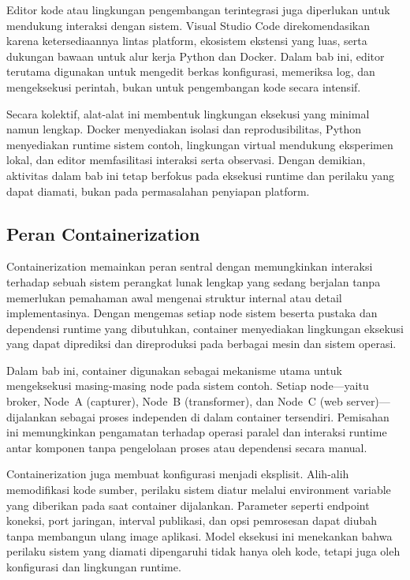 Editor kode atau lingkungan pengembangan terintegrasi juga diperlukan untuk
mendukung interaksi dengan sistem. Visual Studio Code direkomendasikan karena
ketersediaannya lintas platform, ekosistem ekstensi yang luas, serta dukungan
bawaan untuk alur kerja Python dan Docker. Dalam bab ini, editor terutama
digunakan untuk mengedit berkas konfigurasi, memeriksa log, dan mengeksekusi
perintah, bukan untuk pengembangan kode secara intensif.

Secara kolektif, alat-alat ini membentuk lingkungan eksekusi yang minimal namun
lengkap. Docker menyediakan isolasi dan reprodusibilitas, Python menyediakan
runtime sistem contoh, lingkungan virtual mendukung eksperimen lokal, dan editor
memfasilitasi interaksi serta observasi. Dengan demikian, aktivitas dalam bab ini
tetap berfokus pada eksekusi runtime dan perilaku yang dapat diamati, bukan pada
permasalahan penyiapan platform.

\subsection{Peran Containerization}

Containerization memainkan peran sentral dengan memungkinkan interaksi terhadap
sebuah sistem perangkat lunak lengkap yang sedang berjalan tanpa memerlukan
pemahaman awal mengenai struktur internal atau detail implementasinya. Dengan
mengemas setiap node sistem beserta pustaka dan dependensi runtime yang
dibutuhkan, container menyediakan lingkungan eksekusi yang dapat diprediksi dan
direproduksi pada berbagai mesin dan sistem operasi.

Dalam bab ini, container digunakan sebagai mekanisme utama untuk mengeksekusi
masing-masing node pada sistem contoh. Setiap node—yaitu broker, Node~A
(capturer), Node~B (transformer), dan Node~C (web server)—dijalankan sebagai proses
independen di dalam container tersendiri. Pemisahan ini memungkinkan pengamatan
terhadap operasi paralel dan interaksi runtime antar komponen tanpa pengelolaan
proses atau dependensi secara manual.

Containerization juga membuat konfigurasi menjadi eksplisit. Alih-alih
memodifikasi kode sumber, perilaku sistem diatur melalui environment variable
yang diberikan pada saat container dijalankan. Parameter seperti endpoint
koneksi, port jaringan, interval publikasi, dan opsi pemrosesan dapat diubah
tanpa membangun ulang image aplikasi. Model eksekusi ini menekankan bahwa
perilaku sistem yang diamati dipengaruhi tidak hanya oleh kode, tetapi juga oleh
konfigurasi dan lingkungan runtime.

